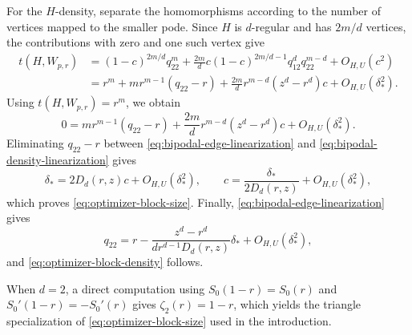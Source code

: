 \begin{remark}
For the \(H\)-density, separate the homomorphisms according to the number of
vertices mapped to the smaller pode.  Since \(H\) is \(d\)-regular and has
\(2m/d\) vertices, the contributions with zero and one such vertex give
\begin{align*}
  t(H,W_{p,r})
  &=(1-c)^{2m/d}q_{22}^m
    +\frac{2m}{d}c(1-c)^{2m/d-1}
      q_{12}^d q_{22}^{m-d}+O_{H,U}(c^2)\\
  &=r^m+m r^{m-1}(q_{22}-r)
    +\frac{2m}{d}r^{m-d}(z^d-r^d)c
    +O_{H,U}(\delta_*^2).
\end{align*}
Using \(t(H,W_{p,r})=r^m\), we obtain
\begin{equation}\label{eq:bipodal-density-linearization}
  0=m r^{m-1}(q_{22}-r)
    +\frac{2m}{d}r^{m-d}(z^d-r^d)c
    +O_{H,U}(\delta_*^2).
\end{equation}
Eliminating \(q_{22}-r\) between
\eqref{eq:bipodal-edge-linearization} and
\eqref{eq:bipodal-density-linearization} gives
\[
  \delta_*=2D_d(r,z)c+O_{H,U}(\delta_*^2),
  \qquad
  c=\frac{\delta_*}{2D_d(r,z)}+O_{H,U}(\delta_*^2),
\]
which proves \eqref{eq:optimizer-block-size}.  Finally,
\eqref{eq:bipodal-edge-linearization} gives
\[
  q_{22}
  =r-\frac{z^d-r^d}{d r^{d-1}D_d(r,z)}\delta_*
   +O_{H,U}(\delta_*^2),
\]
and \eqref{eq:optimizer-block-density} follows.

When $d=2$, a direct computation using $S_0(1-r)=S_0(r)$ and
$S_0'(1-r)=-S_0'(r)$ gives $\zeta_2(r)=1-r$, which yields the
triangle specialization of \eqref{eq:optimizer-block-size} used in the
introduction.
\end{remark}
